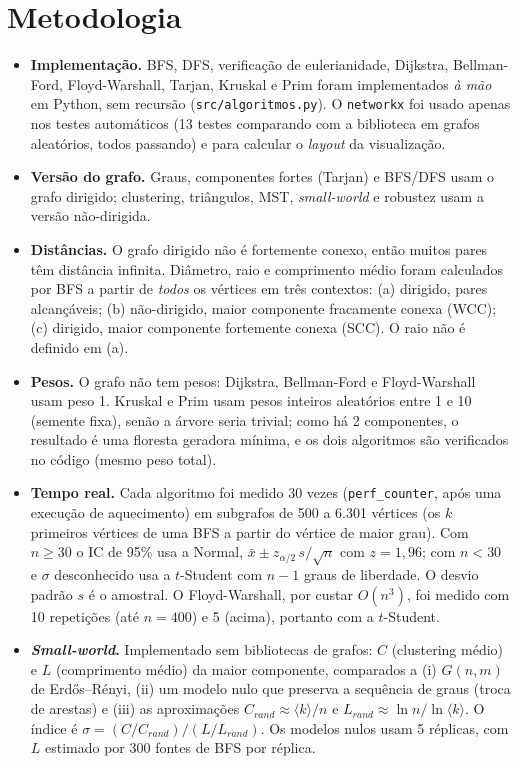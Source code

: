 \documentclass[10pt,a4paper,twocolumn]{article}
\begin{document}
\section{Metodologia}
\begin{itemize}
\item \textbf{Implementação.} BFS, DFS, verificação de eulerianidade, Dijkstra, Bellman-Ford, Floyd-Warshall, Tarjan, Kruskal e Prim foram implementados \emph{à mão} em Python, sem recursão (\texttt{src/algoritmos.py}). O \texttt{networkx} foi usado apenas nos testes automáticos (13 testes comparando com a biblioteca em grafos aleatórios, todos passando) e para calcular o \emph{layout} da visualização.
\item \textbf{Versão do grafo.} Graus, componentes fortes (Tarjan) e BFS/DFS usam o grafo dirigido; clustering, triângulos, MST, \emph{small-world} e robustez usam a versão não-dirigida.
\item \textbf{Distâncias.} O grafo dirigido não é fortemente conexo, então muitos pares têm distância infinita. Diâmetro, raio e comprimento médio foram calculados por BFS a partir de \emph{todos} os vértices em três contextos: (a) dirigido, pares alcançáveis; (b) não-dirigido, maior componente fracamente conexa (WCC); (c) dirigido, maior componente fortemente conexa (SCC). O raio não é definido em (a).
\item \textbf{Pesos.} O grafo não tem pesos: Dijkstra, Bellman-Ford e Floyd-Warshall usam peso 1. Kruskal e Prim usam pesos inteiros aleatórios entre 1 e 10 (semente fixa), senão a árvore seria trivial; como há 2 componentes, o resultado é uma floresta geradora mínima, e os dois algoritmos são verificados no código (mesmo peso total).
\item \textbf{Tempo real.} Cada algoritmo foi medido 30 vezes (\texttt{perf\_counter}, após uma execução de aquecimento) em subgrafos de 500 a 6.301 vértices (os $k$ primeiros vértices de uma BFS a partir do vértice de maior grau). Com $n\ge30$ o IC de 95\% usa a Normal, $\bar x\pm z_{\alpha/2}\,s/\sqrt n$ com $z=1{,}96$; com $n<30$ e $\sigma$ desconhecido usa a $t$-Student com $n-1$ graus de liberdade. O desvio padrão $s$ é o amostral. O Floyd-Warshall, por custar $O(n^3)$, foi medido com 10 repetições (até $n=400$) e 5 (acima), portanto com a $t$-Student.
\item \textbf{\emph{Small-world}.} Implementado sem bibliotecas de grafos: $C$ (clustering médio) e $L$ (comprimento médio) da maior componente, comparados a (i) $G(n,m)$ de Erdős--Rényi, (ii) um modelo nulo que preserva a sequência de graus (troca de arestas) e (iii) as aproximações $C_{rand}\approx\langle k\rangle/n$ e $L_{rand}\approx\ln n/\ln\langle k\rangle$. O índice é $\sigma=(C/C_{rand})/(L/L_{rand})$. Os modelos nulos usam 5 réplicas, com $L$ estimado por 300 fontes de BFS por réplica.

\end{itemize}
\end{document}
